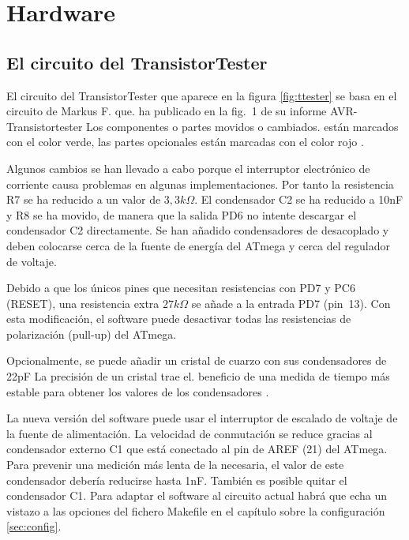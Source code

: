 \chapter{Hardware}

\section{El circuito del TransistorTester}
\label{sec:hardware}

El circuito del  TransistorTester que aparece en  la figura \ref{fig:ttester} se basa  en el circuito de  Markus F. que.
\cite{Frejek} ha publicado en la fig.~1 de su informe AVR-Transistortester Los componentes o partes movidos o cambiados.
están marcados con el color verde, las partes opcionales están marcadas con el color rojo                            .

Algunos  cambios se  han llevado  a cabo  porque el  interruptor electrónico  de corriente  causa problemas  en algunas
implementaciones. Por  tanto la resistencia  R7 se ha  reducido a un  valor de \(3,3k\Omega\).  El condensador C2  se ha
reducido a 10nF y R8 se  ha movido, de manera que la salida PD6 no intente  descargar el condensador C2 directamente. Se
han añadido  condensadores de  desacoplado y deben  colocarse cerca  de la fuente  de energía del  ATmega y  cerca del
regulador de voltaje.

Debido a que los únicos pines que necesitan resistencias  con PD7 y PC6 (RESET), una resistencia extra \(27k\Omega\) se
añade  a la  entrada PD7  (pin~13). Con  esta modificación,  el software  puede desactivar  todas las  resistencias de
polarización (pull-up) del ATmega.

Opcionalmente, se puede añadir un cristal de cuarzo con sus  condensadores de 22pF La precisión de un cristal trae el.
beneficio de una medida de tiempo más estable para obtener los valores de los condensadores                           .

La nueva  versión del  software puede usar  el interruptor  de escalado de  voltaje de la  fuente de  alimentación. La
velocidad de  conmutación se  reduce gracias al  condensador externo  C1 que está  conectado al pin  de AREF  (21) del
ATmega. Para prevenir  una medición más lenta de la  necesaria, el valor de este condensador  debería reducirse hasta
1nF. También  es posible  quitar el condensador  C1. Para  adaptar el software  al circuito actual  habrá que  echa un
vistazo a las opciones del fichero Makefile en el capítulo sobre la configuración \ref{sec:config}.

